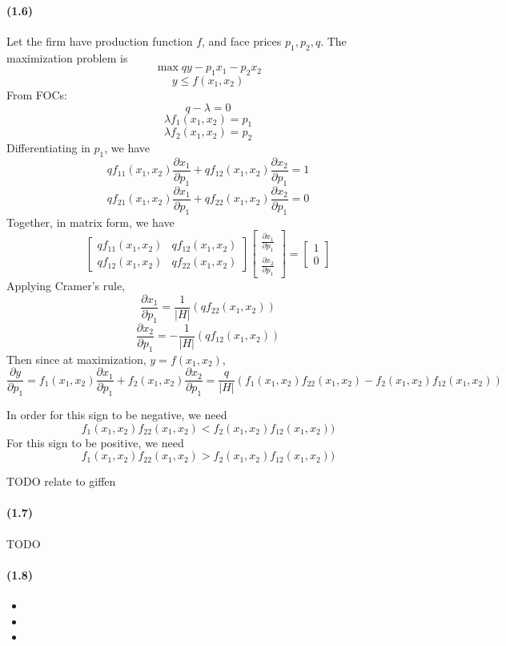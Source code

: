 \documentclass[10pt,letter]{article}
\begin{document}
\paragraph{(1.6)}
Let the firm have production function $f$, and face prices $p_1, p_2, q$. The maximization problem is
\[ \max qy - p_1 x_1 - p_2 x_2 \]
\[ y \le f(x_1, x_2) \]
From FOCs:
\[ q - \lambda = 0 \]
\[ \lambda f_1(x_1, x_2) = p_1 \]
\[ \lambda f_2(x_1, x_2) = p_2 \]
Differentiating in $p_1$, we have
\[ qf_{11}(x_1, x_2) \frac{\partial x_1}{\partial p_1} + qf_{12}(x_1, x_2) \frac{\partial x_2}{\partial p_1} = 1 \]
\[ qf_{21}(x_1, x_2) \frac{\partial x_1}{\partial p_1} + qf_{22}(x_1, x_2) \frac{\partial x_2}{\partial p_1} = 0 \]
Together, in matrix form, we have
\[ \begin{bmatrix}
qf_{11}(x_1, x_2) & qf_{12}(x_1, x_2) \\
qf_{12}(x_1, x_2) & qf_{22}(x_1, x_2)
\end{bmatrix} \begin{bmatrix} \frac{\partial x_1}{\partial p_1} \\ \frac{\partial x_2}{\partial p_1}\end{bmatrix} = \begin{bmatrix} 1 \\ 0 \end{bmatrix} \]
Applying Cramer's rule,
\[ \frac{\partial x_1}{\partial p_1} = \frac{1}{|H|} (qf_{22}(x_1, x_2) ) \]
\[ \frac{\partial x_2}{\partial p_1} =  -\frac{1}{|H|} (qf_{12}(x_1, x_2) ) \]
Then since at maximization, $y = f(x_1, x_2)$,
\[ \frac{\partial y}{\partial p_1} = f_1(x_1, x_2)\frac{\partial x_1}{\partial p_1} + f_2(x_1, x_2)\frac{\partial x_2}{\partial p_1} = \frac{q}{|H|} \left(f_1(x_1, x_2)f_{22}(x_1, x_2) - f_2(x_1, x_2)f_{12}(x_1, x_2) \right)  \]

In order for this sign to be negative, we need
\[ f_1(x_1, x_2)f_{22}(x_1, x_2) < f_2(x_1, x_2)f_{12}(x_1, x_2)) \]
For this sign to be positive, we need
\[ f_1(x_1, x_2)f_{22}(x_1, x_2) > f_2(x_1, x_2)f_{12}(x_1, x_2)) \]

TODO relate to giffen
\paragraph{(1.7)}
TODO
\paragraph{(1.8)}
\begin{itemize}
\item
\item
\item
\end{itemize}
\pagebreak
\end{document}
